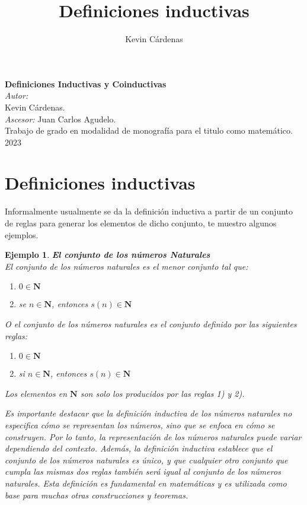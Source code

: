 \documentclass[executivepaper]{article}
\title{Definiciones inductivas}
\author{Kevin Cárdenas}
\newtheorem{ejemplo}[propo]{Ejemplo}
\begin{document}
\begin{titlepage}
    \begin{center}
        {\Huge \textbf{Definiciones Inductivas y Coinductivas}}
        \\[8cm]
        
        \large\emph{Autor:}\\
        Kevin Cárdenas.
        \\[6cm]
        \large\emph{Ascesor:}
        Juan Carlos Agudelo.\\
        Trabajo de grado en modalidad de monografía para el titulo como matemático.\\
        2023
    \end{center}
\end{titlepage}

\newpage
\tableofcontents
\newpage

\section{Definiciones inductivas}

Informalmente usualmente se da la definición inductiva a partir de un conjunto de reglas para generar los elementos de dicho conjunto, te muestro algunos ejemplos.

\begin{ejemplo} \textbf{El conjunto de los números Naturales}\\
El conjunto de los números naturales es el menor conjunto tal que:
\begin{enumerate}
    \item $0 \in \mathbf{N}$
    \item se $n \in \mathbf{N}$, entonces $s(n )\in \mathbf{N}$
\end{enumerate}
O el conjunto de los números naturales es el conjunto definido por las siguientes reglas:
\begin{enumerate}
    \item $0 \in \mathbf{N}$
    \item si $n \in \mathbf{N}$, entonces $s(n )\in \mathbf{N}$
\end{enumerate}
Los elementos en $\mathbf{N}$ son solo los producidos por las reglas 1) y 2).

Es importante destacar que la definición inductiva de los números naturales no especifica cómo se representan los números, sino que se enfoca en cómo se construyen. Por lo tanto, la representación de los números naturales puede variar dependiendo del contexto. Además, la definición inductiva establece que el conjunto de los números naturales es único, y que cualquier otro conjunto que cumpla las mismas dos reglas también será igual al conjunto de los números naturales. Esta definición es fundamental en matemáticas y es utilizada como base para muchas otras construcciones y teoremas.
\end{ejemplo}
\end{document}
